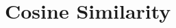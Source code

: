 \section{Cosine Similarity \cite{nlp-1}}\label{Cosine Similarity}























































































































































